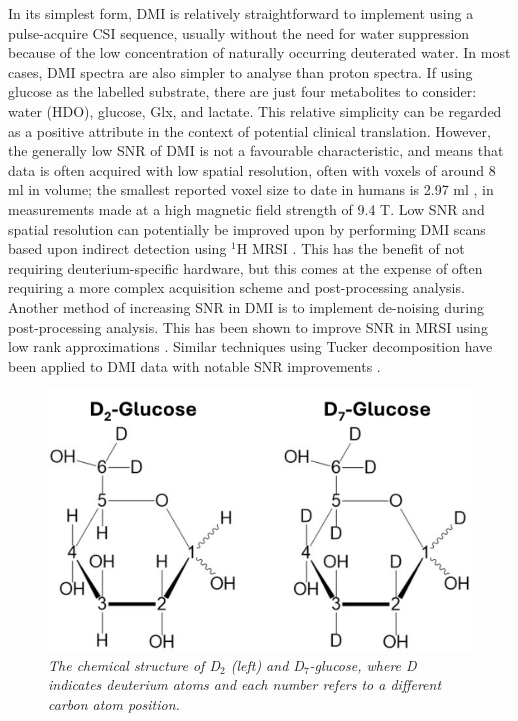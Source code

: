 In its simplest form, \ac{DMI} is relatively straightforward to implement using a pulse-acquire \ac{CSI} sequence, usually without the need for water suppression because of the low concentration of naturally occurring deuterated water. In most cases, \ac{DMI} spectra are also simpler to analyse than proton spectra. If using glucose as the labelled substrate, there are just four metabolites to consider: water (\ac{HDO}), glucose, Glx, and lactate. This relative simplicity can be regarded as a positive attribute in the context of potential clinical translation. However, the generally low \ac{SNR} of \ac{DMI} is not a favourable characteristic, and means that data is often acquired with low spatial resolution, often with voxels of around 8 ml \cite{DeFeyter2021DeuteriumFuture, deGraaf2020OnImaging} in volume; the smallest reported voxel size to date in humans is 2.97 ml \cite{Ruhm2022Dynamic9.4T}, in measurements made at a high magnetic field strength of 9.4 T. Low \ac{SNR} and spatial resolution can potentially be improved upon by performing \ac{DMI} scans based upon indirect detection using $^1$H \ac{MRSI} \cite{vanZijl2020SpectroscopicFluxes, Bednarik2021DeuteriumBrain, Niess2023Reproducibility3T, Ruhm2022Dynamic9.4T}. This has the benefit of not requiring deuterium-specific hardware, but this comes at the expense of often requiring a more complex acquisition scheme and post-processing analysis. Another method of increasing \ac{SNR} in \ac{DMI} is to implement de-noising during post-processing analysis. This has been shown to improve \ac{SNR} in \ac{MRSI} using low rank approximations \cite{Nguyen2013DenoisingApproximations}. Similar techniques using Tucker decomposition \cite{Tucker1966SomeAnalysis, Bader2007EfficientTensors} have been applied to \ac{DMI} data with notable \ac{SNR} improvements \cite{vonMorze2021ComparisonT, Kreis2020MeasuringMRI}.

\begin{figure}
    \centering
    \includegraphics[width = 1\textwidth]{Figures/Glucose/Glucose.png}
    \caption{\textit{The chemical structure of D$_2$ (left) and D$_7$-glucose, where D indicates deuterium atoms and each number refers to a different carbon atom position.}}
    \label{fig:Glu:Glucose}
\end{figure}

